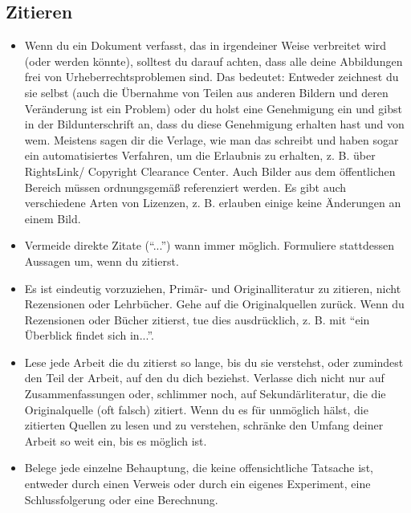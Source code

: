 \subsection{Zitieren}
\begin{itemize}

\item Wenn du ein Dokument verfasst, das in irgendeiner Weise verbreitet wird (oder werden könnte), solltest du darauf achten, dass alle deine Abbildungen frei von Urheberrechtsproblemen sind. Das bedeutet: Entweder zeichnest du sie selbst (auch die Übernahme von Teilen aus anderen Bildern und deren Veränderung ist ein Problem) oder du holst eine Genehmigung ein und gibst in der Bildunterschrift an, dass du diese Genehmigung erhalten hast und von wem. Meistens sagen dir die Verlage, wie man das schreibt und haben sogar ein automatisiertes Verfahren, um die Erlaubnis zu erhalten, z. B. über RightsLink/ Copyright Clearance Center. Auch Bilder aus dem öffentlichen Bereich müssen ordnungsgemäß referenziert werden. Es gibt auch verschiedene Arten von Lizenzen, z. B. erlauben einige keine Änderungen an einem Bild.

\item Vermeide direkte Zitate (``...'') wann immer möglich. Formuliere stattdessen Aussagen um, wenn du zitierst.

\item Es ist eindeutig vorzuziehen, Primär- und Originalliteratur zu zitieren, nicht Rezensionen oder Lehrbücher. Gehe auf die Originalquellen zurück. Wenn du Rezensionen oder Bücher zitierst, tue  dies ausdrücklich, z. B. mit ``ein Überblick findet sich in...''.

\item Lese jede Arbeit die du zitierst so lange, bis du sie verstehst, oder zumindest den Teil der Arbeit, auf den du dich beziehst. Verlasse dich nicht nur auf Zusammenfassungen oder, schlimmer noch, auf Sekundärliteratur, die die Originalquelle (oft falsch) zitiert. Wenn du es für unmöglich hälst, die zitierten Quellen zu lesen und zu verstehen, schränke den Umfang deiner Arbeit so weit ein, bis es möglich ist.

\item Belege jede einzelne Behauptung, die keine offensichtliche Tatsache ist, entweder durch einen Verweis oder durch ein eigenes Experiment, eine Schlussfolgerung oder eine Berechnung. 

\end{itemize}

